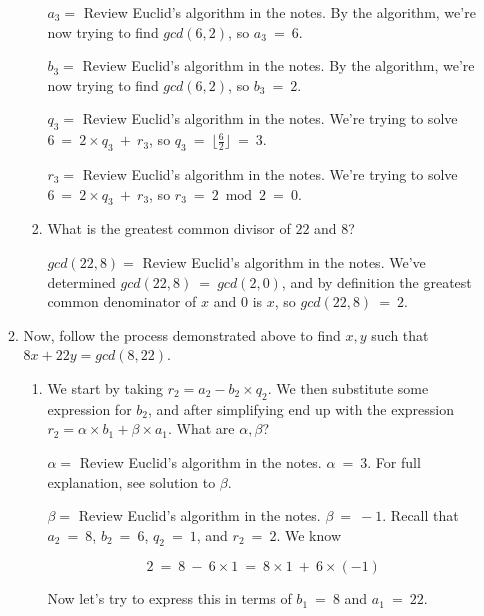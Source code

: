\documentclass[11pt, preview]{standalone} %
\begin{document}
\begin{enumerate}
\begin{enumerate}
\begin{enumerate}
\begin{Freeform}{6}
$a_3 = $
\Hint Review Euclid's algorithm in the notes.
\Solution By the algorithm, we're now trying to find $gcd(6, 2)$, so $a_3\ =\ 6$.
\end{Freeform}
\begin{Freeform}{2}
$b_3 = $
\Hint Review Euclid's algorithm in the notes.
\Solution By the algorithm, we're now trying to find $gcd(6, 2)$, so $b_3\ =\ 2$.
\end{Freeform}
\begin{Freeform}{3}
$q_3 = $
\Hint Review Euclid's algorithm in the notes.
\Solution We're trying to solve $6\ =\ 2 \times q_3\ +\ r_3$, so $q_3\ =\ \lfloor \frac{6}{2} \rfloor\ =\ 3$.
\end{Freeform}
\begin{Freeform}{0}
$r_3 = $
\Hint Review Euclid's algorithm in the notes.
\Solution We're trying to solve $6\ =\ 2 \times q_3\ +\ r_3$, so $r_3\ =\ 2 \bmod 2\ =\ 0$.
\end{Freeform}
\item What is the greatest common divisor of $22$ and $8$?
\begin{Freeform}{2}
$gcd(22,8) = $
\Hint Review Euclid's algorithm in the notes.
\Solution We've determined $gcd(22, 8)\ =\ gcd(2, 0)$, and by definition the greatest common denominator of $x$ and $0$ is $x$, so $gcd(22, 8)\ =\ 2$.
\end{Freeform}
\end{enumerate}
\item Now, follow the process demonstrated above to find $x, y$ such that $8x + 22y = gcd(8,22)$. 
\begin{enumerate}
\item We start by taking $r_2 = a_2 - b_2\times q_2$.  We then substitute some expression for $b_2$, and after simplifying end up with the expression $r_2 = \alpha \times b_1 + \beta \times a_1$. What are $\alpha, \beta$?
\begin{Freeform}{3}
$\alpha = $
\Hint Review Euclid's algorithm in the notes.
\Solution $\alpha\ =\ 3$. For full explanation, see solution to $\beta$. 
\end{Freeform}
\begin{Freeform}{-1}
$\beta = $
\Hint Review Euclid's algorithm in the notes.
\Solution $\beta\ =\ -1$. Recall that $a_2\ =\ 8$, $b_2\ =\ 6$, $q_2\ =\ 1$, and $r_2\ =\ 2$. We know 

$$2\ =\ 8\ -\ 6 \times 1\ =\ 8 \times 1\ +\ 6 \times (-1)$$

Now let's try to express this in terms of $b_1\ =\ 8$ and $a_1\ =\ 22$.\\


\end{Freeform}
\end{enumerate}
\end{enumerate}
\end{enumerate}
\end{document}
